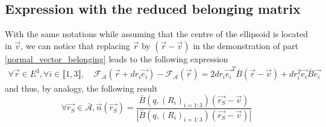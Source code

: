 \documentclass[class=report, float=false, crop=false]{standalone}
\begin{document}
\subsection{Expression with the reduced belonging matrix}

With the same notations while assuming that the centre of the ellipsoid is located in $\vec{v}$, we can notice that replacing $\vec{r}$ by $(\vec{r} - \vec{v})$ in the demonstration of part \ref{normal_vector_belonging} leads to the following expression
\begin{align*}
\forall \vec{r} \in E^3, \forall i \in \llbracket1,3\rrbracket,~ &\mathcal{F}_{\mathcal{A}}(\vec{r} + dr_i\vec{e_i}) - \mathcal{F}_{\mathcal{A}}(\vec{r}) = 2dr_i\vec{e_i}^T\bar{B}(\vec{r} - \vec{v}) + dr_i^2\vec{e_i}\bar{B}\vec{e_i}
\end{align*}
and thus, by analogy, the following result
\begin{equation}
\boxed{\forall \vec{r_S}\in \bar{\mathcal{A}}, \vec{n}(\vec{r_S}) = \frac{\bar{B}(q,(R_i)_{i=1:3})(\vec{r_S} - \vec{v})}{|\bar{B}(q,(R_i)_{i=1:3})(\vec{r_S} - \vec{v})|}}
\label{surface_vec_reduced}
\end{equation}

% 
\end{document}

